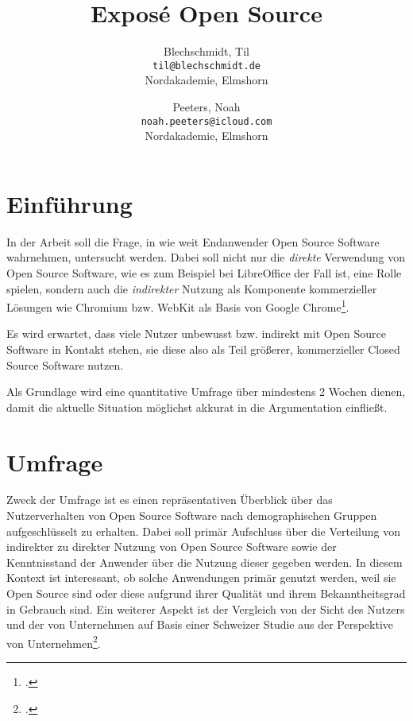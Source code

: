 \documentclass[a4paper]{article}
\title{Exposé Open Source}
\author{
  Blechschmidt, Til\\
  \texttt{til@blechschmidt.de}\\
  Nordakademie, Elmshorn
  \and
  Peeters, Noah\\
  \texttt{noah.peeters@icloud.com}\\
  Nordakademie, Elmshorn
}
\begin{document}
	\maketitle
	
	\section{Einführung}
		
		In der Arbeit soll die Frage, in wie weit Endanwender Open Source Software wahrnehmen, untersucht werden. Dabei soll nicht nur die \emph{direkte} Verwendung von Open Source Software, wie es zum Beispiel bei LibreOffice der Fall ist, eine Rolle spielen, sondern auch die \emph{indirekter} Nutzung als Komponente kommerzieller Lösungen wie Chromium bzw. WebKit als Basis von Google Chrome\footcite{is:open:source:right:for:you}.
		
		Es wird erwartet, dass viele Nutzer unbewusst bzw. indirekt mit Open Source Software in Kontakt stehen, sie diese also als Teil größerer, kommerzieller Closed Source Software nutzen.
		
		Als Grundlage wird eine quantitative Umfrage über mindestens 2 Wochen dienen, damit die aktuelle Situation möglichst akkurat in die Argumentation einfließt.
	
	\section{Umfrage}
		Zweck der Umfrage ist es einen repräsentativen Überblick über das Nutzerverhalten von Open Source Software nach demographischen Gruppen aufgeschlüsselt zu erhalten. Dabei soll primär Aufschluss über die Verteilung von indirekter zu direkter Nutzung von Open Source Software sowie der Kenntnisstand der Anwender über die Nutzung dieser gegeben werden. In diesem Kontext ist interessant, ob solche Anwendungen primär genutzt werden, weil sie Open Source sind oder diese aufgrund ihrer Qualität und ihrem Bekanntheitsgrad in Gebrauch sind. Ein weiterer Aspekt ist der Vergleich von der Sicht des Nutzers und der von Unternehmen auf Basis einer Schweizer Studie aus der Perspektive von Unternehmen\footcite{oss:studie}.\\
\end{document}
